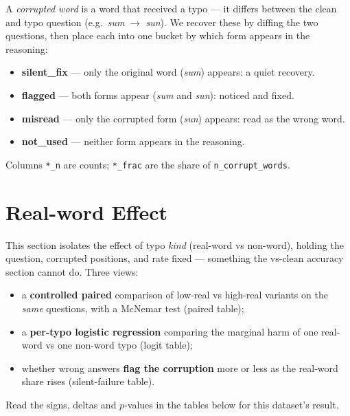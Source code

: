 \documentclass[11pt]{article}
\begin{document}
\noindent A \emph{corrupted word} is a word that received a
typo --- it differs between the clean and typo question (e.g.\ \emph{sum} $\to$
\emph{sun}). We recover these by diffing the two questions, then place each into one
bucket by which form appears in the reasoning:
\begin{itemize}\setlength{\itemsep}{1pt}
  \item \textbf{silent\_fix} --- only the original word (\emph{sum}) appears: a quiet recovery.
  \item \textbf{flagged} --- both forms appear (\emph{sum} and \emph{sun}): noticed and fixed.
  \item \textbf{misread} --- only the corrupted form (\emph{sun}) appears: read as the wrong word.
  \item \textbf{not\_used} --- neither form appears in the reasoning.
\end{itemize}
\noindent Columns \texttt{*\_n} are counts; \texttt{*\_frac} are the share of
\texttt{n\_corrupt\_words}.
\medskip



\section*{Real-word Effect}
\noindent This section isolates the effect of typo \emph{kind}
(real-word vs non-word), holding the question, corrupted positions, and rate fixed ---
something the vs-clean accuracy section cannot do. Three views:
\begin{itemize}\setlength{\itemsep}{1pt}
  \item a \textbf{controlled paired} comparison of low-real vs high-real variants on
  the \emph{same} questions, with a McNemar test (paired table);
  \item a \textbf{per-typo logistic regression} comparing the marginal harm of one
  real-word vs one non-word typo (logit table);
  \item whether wrong answers \textbf{flag the corruption} more or less as the
  real-word share rises (silent-failure table).
\end{itemize}
\noindent Read the signs, deltas and $p$-values in the tables below for this
dataset's result.
\medskip


\end{document}
